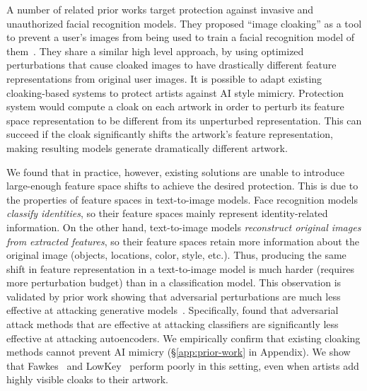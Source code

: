 A number of related prior works target protection against invasive and
unauthorized facial recognition models. They proposed ``image cloaking'' as a
tool to prevent a user's images from being used to train a facial recognition
model of
them~\cite{shan2020fawkes,cherepanova2021lowkey,chandrasekaran2020face,evtimov2020foggysight,wenger2021sok}. They
share a similar high level approach, by using optimized perturbations that
cause cloaked images to have drastically different feature representations
from original user images. %
It is possible to
adapt existing cloaking-based systems to protect artists against AI style
mimicry. Protection system would compute a cloak on each artwork in order
to perturb its feature space representation to be different from its
unperturbed representation. This can succeed if the cloak significantly shifts
the artwork's feature representation, making resulting models generate
dramatically different artwork.

We found that in practice, however, existing solutions are unable to
introduce large-enough feature space shifts to achieve the desired
protection. This is due to the properties of feature spaces in text-to-image
models. Face recognition models {\em classify identities}, so their feature
spaces mainly represent identity-related information. On the other hand,
text-to-image models {\em reconstruct original images from extracted
  features}, so their feature spaces retain more information about the
original image (objects, locations, color, style, etc.). Thus, producing the
same shift in feature representation in a text-to-image model is much harder
(requires more perturbation budget) than in a classification model. This
observation is validated by prior work showing that adversarial perturbations
are much less effective at attacking generative
models~\cite{kos2018adversarial,gondim2018adversarial,tabacof2016adversarial}. Specifically,
\cite{kos2018adversarial,tabacof2016adversarial} found that adversarial
attack methods that are effective at attacking classifiers are significantly
less effective at attacking autoencoders. We empirically confirm that
existing cloaking methods cannot prevent AI mimicry (\S\ref{app:prior-work}
in Appendix). We show that Fawkes~\cite{shan2020fawkes} and
LowKey~\cite{cherepanova2021lowkey} perform poorly in this setting, even when
artists add highly visible cloaks to their artwork.

